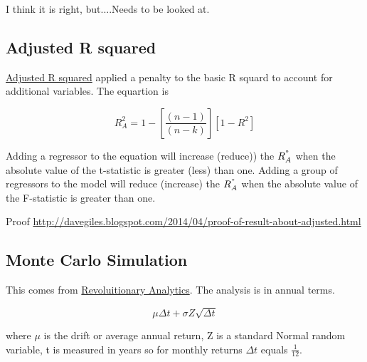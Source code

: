 \documentclass[12pt, a4paper, oneside]{article}\usepackage{graphicx, color}
\begin{document}
I think it is right, but....Needs to be looked at. 

\subsection{Adjusted R squared}
\href{http://davegiles.blogspot.ca/2013/05/when-will-adjusted-r-squared-increase.html}{Adjusted R squared} applied a penalty to the basic R squard to account for additional variables.  The equartion is 

\begin{equation}
R_A^2 = 1 - \left [ \frac{(n-1)}{(n-k)} \right ] [1 - R^2]
\end{equation}

Adding a regressor to the equation will increase (reduce)) the $R_A^"$ when the absolute value of the t-statistic is greater (less) than one. Adding a group of regressors to the model will reduce (increase) the $R_A^"$ when the absolute value of the F-statistic is greater than one.  

Proof \href{http://davegiles.blogspot.com/2014/04/proof-of-result-about-adjusted.html}{http://davegiles.blogspot.com/2014/04/proof-of-result-about-adjusted.html}

\subsection{Monte Carlo Simulation}
This comes from \href{http://blog.revolutionanalytics.com/2014/04/quantitative-finance-applications-in-r-5.html}{Revoluitionary Analytics}.  The analysis is in annual terms.  

\begin{equation}
\mu \Delta t + \sigma Z \sqrt{\Delta t}
\end{equation}

where $\mu$ is the drift or average annual return, Z is a standard Normal random variable, t is measured in years so for monthly returns $\Delta t$ equals $\frac{1}{12}$.
\end{document}
